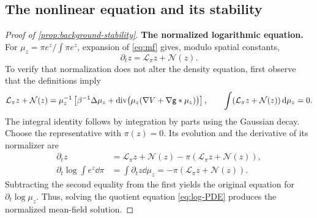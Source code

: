 \documentclass[11pt,reqno]{amsart}
\numberwithin{equation}{section}
\theoremstyle{plain}
\theoremstyle{remark}
\DeclareMathOperator{\diver}{div}
\newcommand{\parheading}[1]{\par\medskip\noindent\textbf{#1}\ }
\begin{document}
\subsection{The nonlinear equation and its stability}\label{app:nonlinear-stability}
\begin{proof}[Proof of \cref{prop:background-stability}]
\parheading{The normalized logarithmic equation.}
For $\mu_z=\pi e^z/\int\pi e^z$, expansion of \eqref{eq:mf} gives, modulo spatial constants,
\begin{equation}\label{eq:log-PDE}
 \partial_tz=\mathcal L_\pi z+\mathcal N(z).
\end{equation}
To verify that normalization does not alter the density equation, first observe that the definitions imply
\begin{equation}\label{eq:logarithmic-equation-expansion}
 \mathcal L_\pi z+\mathcal N(z)
 =\mu_z^{-1}\left[\beta^{-1}\Delta\mu_z+
      \diver\bigl(\mu_z(\nabla V+\nabla\g*\mu_z)\bigr)\right],
 \qquad
 \int(\mathcal L_\pi z+\mathcal N(z))\dd\mu_z=0.
\end{equation}
The integral identity follows by integration by parts using the Gaussian decay. Choose the representative with $\pi(z)=0$. Its evolution and the derivative of its normalizer are
\begin{align}
 \partial_tz&=\mathcal L_\pi z+\mathcal N(z)
       -\pi(\mathcal L_\pi z+\mathcal N(z)),\label{eq:centered-log-equation}\\
 \partial_t\log\int e^z\dd\pi
      &=\int\partial_tz\dd\mu_z
       =-\pi(\mathcal L_\pi z+\mathcal N(z)).\label{eq:log-normalizer-derivative}
\end{align}
Subtracting the second equality from the first yields the original equation for $\partial_t\log\mu_z$. Thus, solving the quotient equation \eqref{eq:log-PDE} produces the normalized mean-field solution.


\end{proof}
\end{document}
